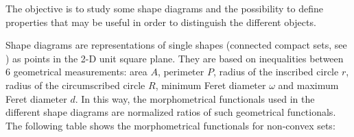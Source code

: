 \def\difficulty{2}



\begin{note}The objective is to study some shape diagrams and the possibility to define properties that may be useful in order to distinguish the different objects.\end{note}

Shape diagrams are representations of single shapes (connected compact sets, see \cite{Rivollier2010a,Rivollier2010b,Rivollier2010c}) as points in the 2-D unit square plane. They are based on inequalities between 6 geometrical measurements: area $A$, perimeter $P$, radius of the inscribed circle $r$, radius of the circumscribed circle $R$, minimum Feret diameter $\omega$ and maximum Feret diameter $d$. In this way, the morphometrical functionals used in the different shape diagrams are normalized ratios of such geometrical functionals. The following table shows the morphometrical functionals for non-convex sets:

